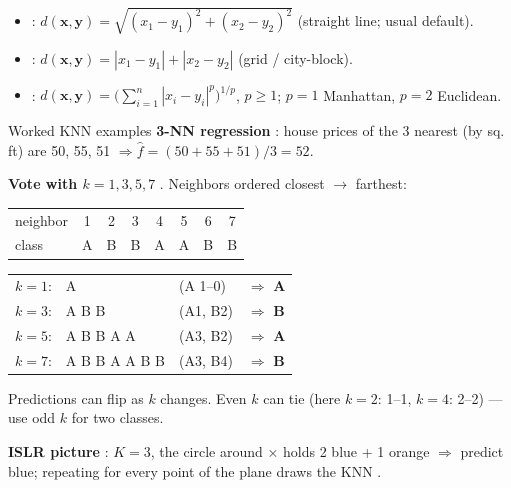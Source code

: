 \begin{keybox}
\begin{itemize}
\item {}: $d(\mathbf x,\mathbf y)=\sqrt{(x_1-y_1)^2+(x_2-y_2)^2}$ (straight line; usual default).
\item {}: $d(\mathbf x,\mathbf y)=|x_1-y_1|+|x_2-y_2|$ (grid / city-block).
\item {}: $d(\mathbf x,\mathbf y)=\big(\sum_{i=1}^n|x_i-y_i|^p\big)^{1/p}$, $p\ge1$; $p=1$ Manhattan, $p=2$ Euclidean.
\end{itemize}
\end{keybox}

\begin{topic}{Worked KNN examples}
\textbf{3-NN regression} : house prices of the 3 nearest (by sq.\,ft) are 50, 55, 51 $\Rightarrow\hat f=(50+55+51)/3=52$.

\textbf{Vote with $k=1,3,5,7$} . Neighbors ordered closest $\to$ farthest:
\begin{tabular}{@{}lccccccc@{}}
neighbor & 1&2&3&4&5&6&7\\
class & A&B&B&A&A&B&B
\end{tabular}

\begin{tabular}{@{}llll@{}}
$k=1$: & A & (A 1--0) & $\Rightarrow$ \textbf{A}\\
$k=3$: & A B B & (A1, B2) & $\Rightarrow$ \textbf{B}\\
$k=5$: & A B B A A & (A3, B2) & $\Rightarrow$ \textbf{A}\\
$k=7$: & A B B A A B B & (A3, B4) & $\Rightarrow$ \textbf{B}
\end{tabular}

Predictions can flip as $k$ changes. Even $k$ can tie (here $k=2$: 1--1, $k=4$: 2--2) --- use odd $k$ for two classes.

\textbf{ISLR picture} : $K=3$, the circle around $\times$ holds 2 blue + 1 orange $\Rightarrow$ predict blue; repeating for every point of the plane draws the KNN .
\end{topic}

